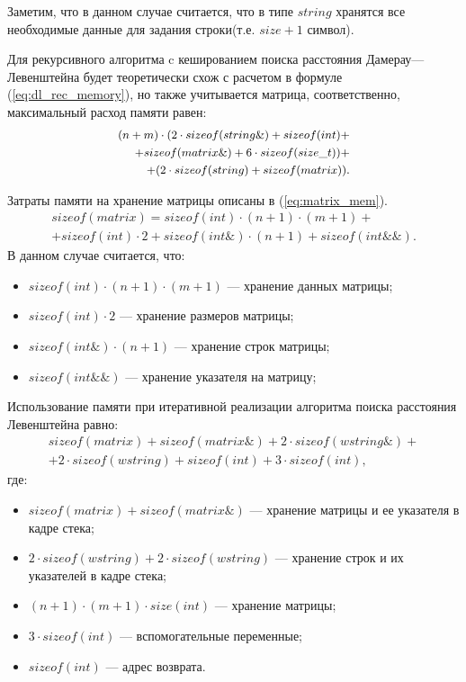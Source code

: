 Заметим, что в данном случае считается, что в типе $string$ хранятся все необходимые данные для задания строки(т.е. $size + 1$ символ).

Для рекурсивного алгоритма c кешированием поиска расстояния Дамерау---Левенштейна будет теоретически схож с расчетом в формуле (\ref{eq:dl_rec_memory}),
но также учитывается матрица, соответственно, максимальный расход памяти равен:
\begin{equation}
	\label{eq:dl_hash_memory}
    \small
	\begin{aligned}
		(n + m) \cdot (2 \cdot sizeof(string\&) + sizeof(int)+\\ +sizeof(matrix\&) + 6 \cdot sizeof(size\_t))+ \\
        + (2 \cdot sizeof(string) + sizeof(matrix)).
	\end{aligned}
\end{equation}

Затраты памяти на хранение матрицы описаны в  (\ref{eq:matrix_mem}).
\begin{equation}
	\label{eq:matrix_mem}
    \begin{aligned}
	sizeof(matrix) = sizeof(int) \cdot (n+1) \cdot (m + 1)+  \\
    + sizeof(int) \cdot 2 + sizeof(int\&) \cdot (n + 1) + sizeof(int\&\&).
    \end{aligned}
\end{equation}
В данном случае считается, что:
\begin{itemize}
	\item $sizeof(int) \cdot (n+1) \cdot (m + 1)$ --- хранение данных матрицы;
	\item $sizeof(int) \cdot 2$ --- хранение размеров матрицы;
	\item $sizeof(int\&) \cdot (n + 1)$ --- хранение строк матрицы;
	\item $sizeof(int\&\&)$ --- хранение указателя на матрицу;
\end{itemize}


Использование памяти при итеративной реализации алгоритма поиска расстояния Левенштейна  равно:
\begin{equation}
	\label{eq:lev_mtr_memory}
	\begin{aligned}
		sizeof(matrix) + sizeof(matrix\&) + 2 \cdot sizeof(wstring\&)+\\
        + 2 \cdot sizeof(wstring) + sizeof(int) + 3 \cdot sizeof(int),
	\end{aligned}
\end{equation}
где:
\begin{itemize}
	\item $sizeof(matrix) + sizeof(matrix\&)$ --- хранение матрицы и ее указателя в кадре стека;
	\item $2 \cdot sizeof(wstring) + 2 \cdot sizeof(wstring)$ --- хранение строк и их указателей в кадре стека;
	\item $(n + 1) \cdot (m + 1) \cdot size(int)$ --- хранение матрицы;
	\item $3 \cdot sizeof(int)$ --- вспомогательные переменные;
	\item $sizeof(int)$ --- адрес возврата.
\end{itemize}

